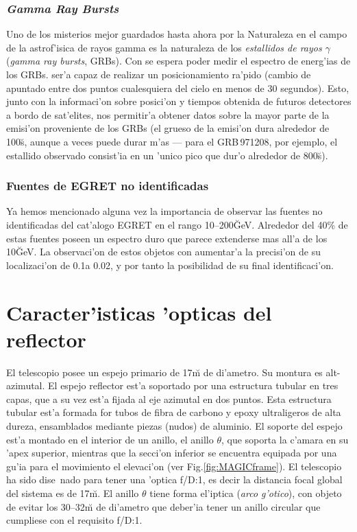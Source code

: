 \subsubsection*{\emph{Gamma Ray Bursts}} 
%
Uno de los misterios mejor guardados hasta ahora por la Naturaleza en
el campo de la astrof'isica de rayos gamma es la naturaleza de los
\emph{estallidos de rayos $\gamma$} (\emph{gamma ray bursts}, GRBs).
Con \MAGIC se espera poder medir el espectro de energ'ias de los GRBs.
\MAGIC ser'a capaz de realizar un posicionamiento ra'pido (cambio de
apuntado entre dos puntos cualesquiera del cielo en menos de 30
segundos). Esto, junto con la informaci'on sobre posici'on y tiempos
obtenida de futuros detectores a bordo de sat'elites, nos permitir'a
obtener datos sobre la mayor parte de la emisi'on proveniente de los
GRBs (el grueso de la emisi'on dura alrededor de 100\u{s}, aunque a
veces puede durar m'as --- para el GRB\,971208, por ejemplo, el
estallido observado consist'ia en un 'unico pico que dur'o alrededor
de 800\u{s}).

\subsubsection*{Fuentes de EGRET no identificadas} 
%
Ya hemos mencionado alguna vez la importancia de observar las fuentes
no identificadas del cat'alogo EGRET en el rango
10--200\u{GeV}. Alrededor del 40\% de estas fuentes poseen un espectro 
duro que parece extenderse mas all'a de los 10\u{GeV}. La observaci'on 
de estos objetos con \MAGIC aumentar'a la precisi'on de su
localizaci'on de 0.1\deg a 0.02\deg, y por tanto la posibilidad de su
final identificaci'on.

\MAGICframefig

\section{Caracter'isticas 'opticas del reflector}
%
El telescopio \MAGIC posee un espejo primario de 17\u{m} de di'ametro.
Su montura es alt-azimutal. El espejo reflector est'a soportado por
una estructura tubular en tres capas, que a su vez est'a fijada al eje
azimutal en dos puntos. Esta estructura tubular est'a formada for
tubos de fibra de carbono y epoxy ultraligeros de alta dureza,
ensamblados mediante piezas (nudos) de aluminio. El soporte del espejo
est'a montado en el interior de un anillo, el anillo $\theta$, que
soporta la c'amara en su 'apex superior, mientras que la secci'on
inferior se encuentra equipada por una gu'ia para el movimiento el
elevaci'on (ver Fig.\ref{fig:MAGICframe}). El telescopio ha sido
dise~nado para tener una 'optica f/D:1, es decir la distancia focal
global del sistema es de 17\u{m}. El anillo $\theta$ tiene forma
el'iptica (\emph{arco g'otico}), con objeto de evitar los 30--32\u{m}
de di'ametro que deber'ia tener un anillo circular que cumpliese con
el requisito f/D:1.

